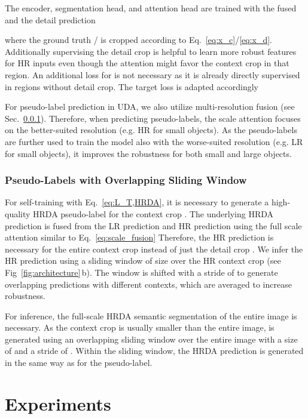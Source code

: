 \documentclass[journal,compsoc]{IEEEtran}
\begin{document}
The encoder, segmentation head, and attention head are trained with the fused and the detail prediction

where the ground truth / is cropped according to Eq.~\ref{eq:x_c}/\ref{eq:x_d}. Additionally supervising the detail crop is helpful to learn more robust features for HR inputs even though the attention might favor the context crop in that region. An additional loss for  is not necessary as it is already directly supervised in regions without detail crop.
The target loss  is adapted accordingly

For pseudo-label prediction in UDA, we also utilize multi-resolution fusion (see Sec.~\ref{sec:overlapping_slide_inference}). Therefore, when predicting pseudo-labels, the scale attention focuses on the better-suited resolution (e.g. HR for small objects). As the pseudo-labels are further used to train the model also with the worse-suited resolution (e.g. LR for small objects), it improves the robustness for both small and large objects. 

\subsubsection{Pseudo-Labels with Overlapping Sliding Window}
\label{sec:overlapping_slide_inference}

For self-training with Eq.~\ref{eq:L_T,HRDA}, it is necessary to generate a high-quality HRDA pseudo-label  for the context crop . The underlying HRDA prediction  is fused from the LR prediction  and HR prediction  using the full scale attention  similar to Eq.~\ref{eq:scale_fusion} 
Therefore, the HR prediction  is necessary for the entire context crop  instead of just the detail crop .
We infer the HR prediction  using a sliding window of size  over the HR context crop  (see Fig~\ref{fig:architecture}\,b). The window is shifted with a stride of  to generate overlapping predictions with different contexts, which are averaged to increase robustness.

For inference, the full-scale HRDA semantic segmentation  of the entire image  is necessary. As the context crop is usually smaller than the entire image,  is generated using an overlapping sliding window over the entire image  with a size of  and a stride of . Within the sliding window, the HRDA prediction is generated in the same way as  for the pseudo-label. 
\section{Experiments}
\label{sec:experiment}
\end{document}
